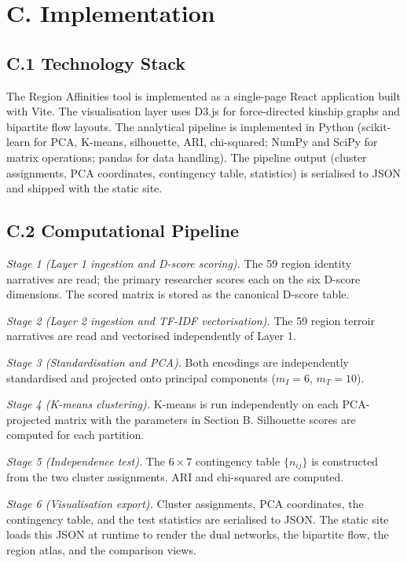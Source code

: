 \documentclass[11pt]{article}
\begin{document}
\section*{C. Implementation}

\subsection*{C.1 Technology Stack}
The Region Affinities tool is implemented as a single-page React application built with Vite. The visualisation layer uses D3.js for force-directed kinship graphs and bipartite flow layouts. The analytical pipeline is implemented in Python (scikit-learn for PCA, K-means, silhouette, ARI, chi-squared; NumPy and SciPy for matrix operations; pandas for data handling). The pipeline output (cluster assignments, PCA coordinates, contingency table, statistics) is serialised to JSON and shipped with the static site.

\subsection*{C.2 Computational Pipeline}

\textit{Stage 1 (Layer 1 ingestion and D-score scoring).} The 59 region identity narratives are read; the primary researcher scores each on the six D-score dimensions. The scored matrix is stored as the canonical D-score table.

\textit{Stage 2 (Layer 2 ingestion and TF-IDF vectorisation).} The 59 region terroir narratives are read and vectorised independently of Layer 1.

\textit{Stage 3 (Standardisation and PCA).} Both encodings are independently standardised and projected onto principal components ($m_I = 6$, $m_T = 10$).

\textit{Stage 4 (K-means clustering).} K-means is run independently on each PCA-projected matrix with the parameters in Section B. Silhouette scores are computed for each partition.

\textit{Stage 5 (Independence test).} The $6 \times 7$ contingency table $\{n_{ij}\}$ is constructed from the two cluster assignments. ARI and chi-squared are computed.

\textit{Stage 6 (Visualisation export).} Cluster assignments, PCA coordinates, the contingency table, and the test statistics are serialised to JSON. The static site loads this JSON at runtime to render the dual networks, the bipartite flow, the region atlas, and the comparison views.
\end{document}

